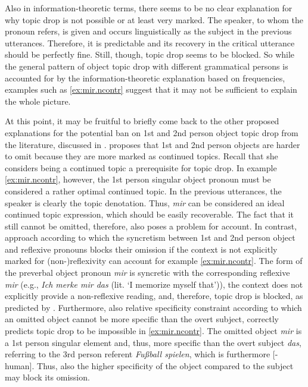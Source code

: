 Also in information-theoretic terms, there seems to be no clear explanation for why topic drop is not possible or at least very marked.
The speaker, to whom the pronoun refers, is given  and occurs linguistically as the subject in the previous utterances.
Therefore, it is predictable  and its recovery in the critical utterance should be perfectly fine. 
Still, though, topic drop seems to be blocked.
So while the general pattern of  object topic drop with different grammatical persons is accounted for by the information-theoretic explanation based on frequencies, examples such as \ref{ex:mir.ncontr} suggest that it may not be sufficient to explain the whole picture.

At this point, it may be fruitful to briefly come back to the other proposed explanations for the potential ban on 1st and 2nd person object topic drop from the literature, discussed in .
\citet{schulz2006} proposes that 1st and 2nd person objects are harder to omit because they are more marked as continued topics.
Recall that she considers being a continued topic  a prerequisite for topic drop.
In example \ref{ex:mir.ncontr}, however, the 1st person singular object pronoun must be considered a rather optimal continued topic.
In the previous utterances, the speaker is clearly the topic denotation.
Thus, \textit{mir} can be considered an ideal continued topic expression, which should be easily recoverable. 
The fact that it still cannot be omitted, therefore, also poses a problem for  account. 
In contrast,  approach according to which the syncretism  between 1st and 2nd person object and reflexive pronouns blocks their omission if the context is not explicitly marked for (non-)reflexivity can account for example \ref{ex:mir.ncontr}.
The form of the preverbal object pronoun \textit{mir} is syncretic  with the corresponding reflexive \textit{mir} (e.g., \textit{Ich merke mir das} (lit. `I memorize myself that')), the context does not explicitly provide a non-reflexive reading, and, therefore, topic drop is blocked, as predicted by \citet{fries1988}.
Furthermore, also  relative specificity constraint according to which an omitted object cannot be more specific than the overt subject, correctly predicts topic drop to be impossible in \ref{ex:mir.ncontr}.
The omitted object \textit{mir} is a 1st person singular element and, thus, more specific than the overt subject \textit{das}, referring to the 3rd person referent \textit{Fußball spielen}, which is furthermore [-human].
Thus, also the higher specificity of the object compared to the subject may block its omission.

